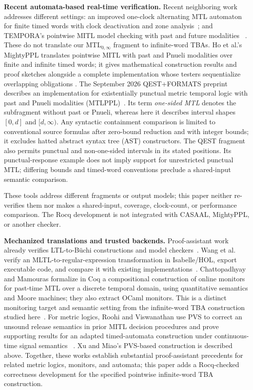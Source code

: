 \documentclass{ieeeaccess}
\newcommand{\runinhead}[1]{\par\noindent\textbf{#1}\enspace}
\begin{document}
\runinhead{Recent automata-based real-time verification.}
Recent neighboring work addresses different settings: an improved one-clock
alternating MTL automaton for finite timed words with clock deactivation and
zone analysis~\cite{bouyer_srivathsan_vishwanath_fossacs25}; and TEMPORA's
pointwise MITL model checking with past and future modalities
~\cite{akshay_et_al_tempora26}. These do not
translate our MTL$_{0,\infty}$ fragment to infinite-word TBAs.
Ho et al.'s MightyPPL translates pointwise MITL with past and Pnueli
modalities over finite and infinite timed words; it gives mathematical
construction results and proof sketches alongside a complete implementation
whose testers sequentialize overlapping obligations
\cite{mightyppl_tacas26}. The September 2026 QEST+FORMATS preprint describes
an implementation for existentially punctual metric temporal logic with past
and Pnueli modalities (MTLPPL)~\cite{mightyppl_qest_arxiv26}. Its term
\emph{one-sided MTL} denotes the subfragment without past or Pnueli, whereas
here it describes interval shapes $[0,d]$ and $[d,\infty)$. Any syntactic
containment comparison is limited to conventional source formulas after
zero-bound reduction and with integer bounds; it excludes hatted abstract syntax tree (AST)
constructors. The QEST fragment also permits punctual and non-one-sided
intervals in its stated positions. Its punctual-response example does not
imply support for unrestricted punctual MTL; differing bounds and timed-word
conventions preclude a shared-input semantic comparison.

These tools address different fragments or output models; this paper neither
re-verifies them nor makes a shared-input, coverage, clock-count, or
performance comparison. The Rocq development is not integrated with CASAAL,
MightyPPL, or another checker.

\runinhead{Mechanized translations and trusted backends.}
Proof-assistant work already verifies LTL-to-B\"uchi constructions and model
checkers~\cite{schimpf_tphols09,cava_cav13,ltl_to_gba_afp,
seidl_sickert_afp19}. Wang et al. verify an MLTL-to-regular-expression
transformation in Isabelle/HOL, export executable code, and compare it with
existing implementations~\cite{wang_mltl_tacas25}. Chattopadhyay and
Mamouras formalize in Coq a compositional construction of online monitors for
past-time MTL over a discrete temporal domain, using quantitative semantics
and Moore machines; they also extract OCaml monitors. This is a distinct
monitoring target and semantic setting from the infinite-word TBA construction
studied here~\cite{chattopadhyay_mamouras_rv20}. For metric logics, Roohi
and Viswanathan use PVS to correct an unsound release semantics in prior MITL
decision procedures and prove supporting results for an adapted
timed-automata construction under continuous-time signal semantics
~\cite{roohi_viswanathan_vmcai18}. Xu and Miao's PVS-based construction is
described above. Together, these works establish substantial proof-assistant
precedents for related metric logics, monitors, and automata; this paper adds a
Rocq-checked correctness development for the specified pointwise infinite-word
TBA construction.
\end{document}
